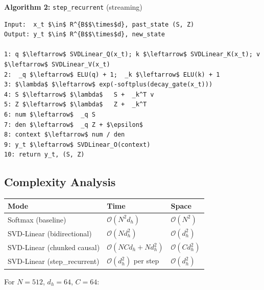 \textbf{Algorithm 2:} \texttt{step\_recurrent} (streaming)
\begin{lstlisting}
Input:  x_t $\in$ R^{B$$\times$d}, past_state (S, Z)
Output: y_t $\in$ R^{B$$\times$d}, new_state

1: q $\leftarrow$ SVDLinear_Q(x_t); k $\leftarrow$ SVDLinear_K(x_t); v $\leftarrow$ SVDLinear_V(x_t)
2:  _q $\leftarrow$ ELU(q) + 1;  _k $\leftarrow$ ELU(k) + 1
3: $\lambda$ $\leftarrow$ exp(-softplus(decay_gate(x_t)))
4: S $\leftarrow$ $\lambda$   S +  _k^T v
5: Z $\leftarrow$ $\lambda$   Z +  _k^T
6: num $\leftarrow$  _q S
7: den $\leftarrow$  _q Z + $\epsilon$
8: context $\leftarrow$ num / den
9: y_t $\leftarrow$ SVDLinear_O(context)
10: return y_t, (S, Z)
\end{lstlisting}

\subsection{Complexity Analysis}

\begin{table}[H]
\centering
\small
\begin{tabular}{lll}
\toprule
\textbf{Mode} & \textbf{Time} & \textbf{Space} \\
\midrule
Softmax (baseline) & $\mathcal{O}(N^2 d_h)$ & $\mathcal{O}(N^2)$ \\
SVD-Linear (bidirectional) & $\mathcal{O}(N d_h^2)$ & $\mathcal{O}(d_h^2)$ \\
SVD-Linear (chunked causal) & $\mathcal{O}(N C d_h + N d_h^2)$ & $\mathcal{O}(C d_h^2)$ \\
SVD-Linear (step\_recurrent) & $\mathcal{O}(d_h^2)$ per step & $\mathcal{O}(d_h^2)$ \\
\bottomrule
\end{tabular}
\end{table}

For $N = 512$, $d_h = 64$, $C = 64$:

\begin{table}[H]
\centering
\small
{}
\end{table}

